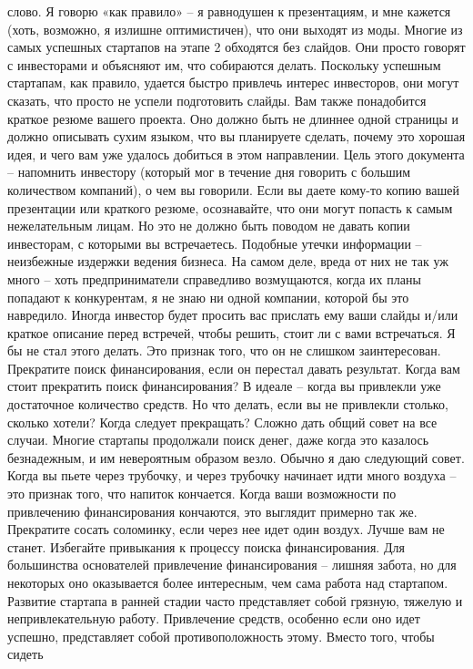 \documentclass[ebook,12pt,oneside,openany]{memoir}
\begin{document}
слово. Я говорю «как правило» – я равнодушен к презентациям, и мне
кажется (хоть, возможно, я излишне оптимистичен), что они выходят из
моды. Многие из самых успешных стартапов на этапе 2 обходятся без
слайдов. Они просто говорят с инвесторами и объясняют им, что
собираются делать. Поскольку успешным стартапам, как правило, удается
быстро привлечь интерес инвесторов, они могут сказать, что просто не
успели подготовить слайды. Вам также понадобится краткое резюме вашего
проекта. Оно должно быть не длиннее одной страницы и должно описывать
сухим языком, что вы планируете сделать, почему это хорошая идея, и
чего вам уже удалось добиться в этом направлении. Цель этого документа
– напомнить инвестору (который мог в течение дня говорить с большим
количеством компаний), о чем вы говорили. Если вы даете кому-то копию
вашей презентации или краткого резюме, осознавайте, что они могут
попасть к самым нежелательным лицам. Но это не должно быть поводом не
давать копии инвесторам, с которыми вы встречаетесь. Подобные утечки
информации – неизбежные издержки ведения бизнеса. На самом деле, вреда
от них не так уж много – хоть предприниматели справедливо возмущаются,
когда их планы попадают к конкурентам, я не знаю ни одной компании,
которой бы это навредило. Иногда инвестор будет просить вас прислать
ему ваши слайды и/или краткое описание перед встречей, чтобы решить,
стоит ли с вами встречаться. Я бы не стал этого делать. Это признак
того, что он не слишком заинтересован. Прекратите поиск
финансирования, если он перестал давать результат. Когда вам стоит
прекратить поиск финансирования? В идеале – когда вы привлекли уже
достаточное количество средств. Но что делать, если вы не привлекли
столько, сколько хотели? Когда следует прекращать? Сложно дать общий
совет на все случаи. Многие стартапы продолжали поиск денег, даже
когда это казалось безнадежным, и им невероятным образом везло. Обычно
я даю следующий совет. Когда вы пьете через трубочку, и через трубочку
начинает идти много воздуха – это признак того, что напиток кончается.
Когда ваши возможности по привлечению финансирования кончаются, это
выглядит примерно так же. Прекратите сосать соломинку, если через нее
идет один воздух. Лучше вам не станет. Избегайте привыкания к процессу
поиска финансирования. Для большинства основателей привлечение
финансирования – лишняя забота, но для некоторых оно оказывается более
интересным, чем сама работа над стартапом. Развитие стартапа в ранней
стадии часто представляет собой грязную, тяжелую и непривлекательную
работу. Привлечение средств, особенно если оно идет успешно,
представляет собой противоположность этому. Вместо того, чтобы сидеть
\end{document}
